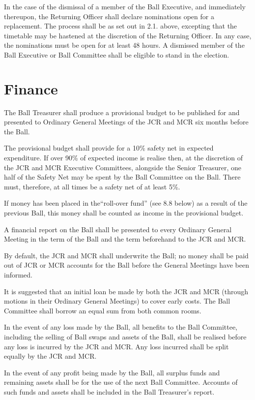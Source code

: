 \appnpara In the case of the dismissal of a member of the Ball Executive, and immediately thereupon, the Returning Officer shall declare nominations open for a replacement.  The process shall be as set out in 2.1. above, excepting that the timetable may be hastened at the discretion of the Returning Officer.  In any case, the nominations must be open for at least 48 hours.  A dismissed member of the Ball Executive or Ball Committee shall be eligible to stand in the election.  

\section{Finance}

\appnpara The Ball Treasurer shall produce a provisional budget to be published for and presented to Ordinary General Meetings of the JCR and MCR six months before the Ball.

\appnpara The provisional budget shall provide for a 10\% safety net in expected expenditure.  If over 90\% of expected income is realise then, at the discretion of the JCR and MCR Executive Committees, alongside the Senior Treasurer, one half of the Safety Net may be spent by the Ball Committee on the Ball.  There must, therefore, at all times be a safety net of at least 5\%.

\appnpara If money has been placed in the``roll-over fund'' (see 8.8 below) as a result of the previous Ball, this money shall be counted as income in the provisional budget.

\appnpara A financial report on the Ball shall be presented to every Ordinary General Meeting in the term of the Ball and the term beforehand to the JCR and MCR.

\appnpara By default, the JCR and MCR shall underwrite the Ball; no money shall be paid out of JCR or MCR accounts for the Ball before the General Meetings have been informed.

\appnpara It is suggested that an initial loan be made by both the JCR and MCR (through motions in their Ordinary General Meetings) to cover early costs.  The Ball Committee shall borrow an equal sum from both common rooms.

\appnpara In the event of any loss made by the Ball, all benefits to the Ball Committee, including the selling of Ball swaps and assets of the Ball, shall be realised before any loss is incurred by the JCR and MCR.  Any loss incurred shall be split equally by the JCR and MCR.  

\appnpara In the event of any profit being made by the Ball, all surplus funds and remaining assets shall be for the use of the next Ball Committee.   Accounts of such funds and assets shall be included in the Ball Treasurer's report.  
